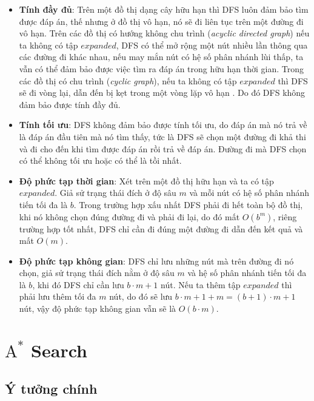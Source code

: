 \begin{itemize}
    \item \textbf{Tính đầy đủ}: Trên một đồ thị dạng cây hữu hạn thì DFS luôn đảm bảo tìm được đáp án, thế nhưng ở đồ thị vô hạn, nó sẽ đi liên tục trên một đường đi vô hạn. Trên các đồ thị có hướng không chu trình (\textit{acyclic directed graph}) nếu ta không có tập $expanded$, DFS có thể mở rộng một nút nhiều lần thông qua các đường đi khác nhau, nếu may mắn nút có hệ số phân nhánh lùi thấp, ta vẫn có thể đảm bảo được việc tìm ra đáp án trong hữu hạn thời gian. Trong các đồ thị có chu trình (\textit{cyclic graph}), nếu ta không có tập $expanded$ thì DFS sẽ đi vòng lại, dẫn đến bị kẹt trong một vòng lặp vô hạn \cite{Russell_Norvig_Chang_2022}. Do đó DFS không đảm bảo được tính đầy đủ.

    \item \textbf{Tính tối ưu}: DFS không đảm bảo được tính tối ưu, do đáp án mà nó trả về là đáp án đầu tiên mà nó tìm thấy, tức là DFS sẽ chọn một đường đi khả thi và đi cho đến khi tìm được đáp án rồi trả về đáp án. Đường đi mà DFS chọn có thể không tối ưu hoặc có thể là tồi nhất.

    \item \textbf{Độ phức tạp thời gian}: Xét trên một đồ thị hữu hạn và ta có tập $expanded$. Giả sử trạng thái đích ở độ sâu $m$ và mỗi nút có hệ số phân nhánh tiến tối đa là $b$. Trong trường hợp xấu nhất DFS phải đi hết toàn bộ đồ thị, khi nó không chọn đúng đường đi và phải đi lại, do đó mất $O(b^m)$, riêng trường hợp tốt nhất, DFS chỉ cần đi đúng một đường đi dẫn đến kết quả và mất $O(m)$.

    \item \textbf{Độ phức tạp không gian}: DFS chỉ lưu những nút mà trên đường đi nó chọn, giả sử trạng thái đích nằm ở độ sâu $m$ và hệ số phân nhánh tiến tối đa là $b$, khi đó DFS chỉ cần lưu $b \cdot m + 1$ nút. Nếu ta thêm tập $expanded$ thì phải lưu thêm tối đa $m$ nút, do đó sẽ lưu $b\cdot m + 1 + m = (b + 1)\cdot m +1$ nút, vậy độ phức tạp không gian vẫn sẽ là $O(b\cdot m)$.
\end{itemize}

\newpage
\section{$\text{A}^*$ Search}

\subsection{Ý tưởng chính}

